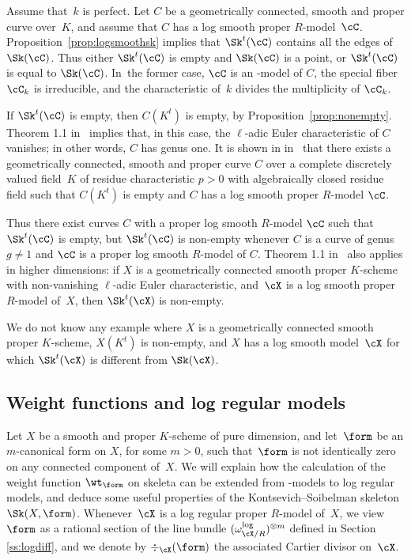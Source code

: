 \begin{example}
Assume that~$k$ is perfect. Let $C$ be a geometrically connected, smooth and proper curve over~$K$, and assume that $C$ has a log smooth proper $R$\nobreakdash-model~$\cC$. Proposition~\ref{prop:logsmoothsk} implies that
$\Sk^t(\cC)$ contains all the edges of $\Sk(\cC)$.
Thus either $\Sk^t(\cC)$ is empty and $\Sk(\cC)$ is a point, or $\Sk^t(\cC)$ is equal to $\Sk(\cC)$.
In~the former case, $\cC$ is an \snc-model of $C$, the special fiber $\cC_k$ is irreducible, and the characteristic of~$k$ divides the multiplicity of $\cC_k$.

If $\Sk^t(\cC)$ is empty, then $C(K^t)$ is empty, by Proposition~\ref{prop:nonempty}.
Theorem 1.1 in~\cite{mitsui-smeets} implies that, in this case, the $\ell$-adic Euler characteristic of $C$ vanishes; in other words, $C$ has genus one.
It is shown in in~\cite{mitsui-smeets} that there exists a geometrically connected, smooth and proper curve $C$ over a complete discretely valued field~$K$ of residue characteristic $p>0$ with algebraically closed residue field such that $C(K^t)$ is
empty and $C$ has a log smooth proper $R$\nobreakdash-model $\cC$.

Thus there exist curves $C$ with a proper log smooth $R$\nobreakdash-model $\cC$ such that $\Sk^t(\cC)$ is empty, but $\Sk^t(\cC)$ is non-empty whenever $C$ is a curve of genus $g\neq 1$ and $\cC$ is a proper log smooth $R$\nobreakdash-model of $C$.
Theorem 1.1 in~\cite{mitsui-smeets} also applies in higher dimensions:
if $X$ is a geometrically connected smooth proper $K$\nobreakdash-scheme with non-vanishing $\ell$-adic Euler characteristic, and~$\cX$ is a log smooth proper $R$\nobreakdash-model of~$X$, then $\Sk^t(\cX)$ is non-empty.

We do not know any example where $X$ is a geometrically connected smooth proper $K$\nobreakdash-scheme,
$X(K^t)$ is non-empty, and $X$ has a log smooth model~$\cX$ for which $\Sk^t(\cX)$ is different from $\Sk(\cX)$.
\end{example}

\subsection{Weight functions and log regular models}
Let $X$ be a smooth and proper $K$\nobreakdash-scheme of pure dimension, and let~$\form$ be an $m$-canonical form on $X$, for some $m>0$, such that~$\form$ is not identically zero on any connected component of~$X$. We will explain how the calculation of the weight function $\wt_{\form}$ on skeleta can be extended from \snc-models to log regular models, and deduce some useful properties of the Kontsevich--Soibelman skeleton $\Sk(X,\form)$. Whenever~$\cX$ is a log regular proper $R$\nobreakdash-model of~$X$, we view~$\form$ as a rational section of the line bundle $(\omega^{\log}_{\cX/R})^{\otimes m}$ defined in Section \ref{ss:logdiff}, and we denote by $\div_{\cX}(\form)$ the associated Cartier divisor on~$\cX$.

